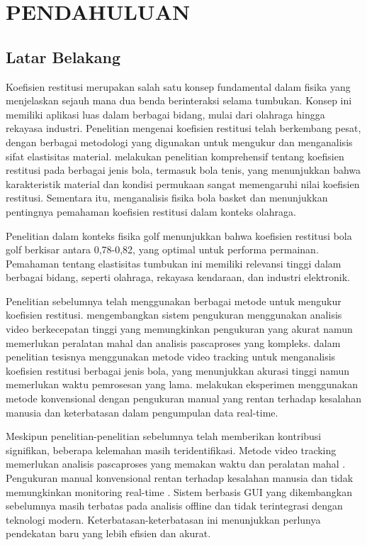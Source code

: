 \chapter{PENDAHULUAN}

\section{Latar Belakang}\label{sec:latar}
 Koefisien restitusi merupakan salah satu konsep fundamental dalam fisika yang menjelaskan sejauh mana dua benda berinteraksi selama tumbukan. Konsep ini memiliki aplikasi luas dalam berbagai bidang, mulai dari olahraga hingga rekayasa industri. Penelitian mengenai koefisien restitusi telah berkembang pesat, dengan berbagai metodologi yang digunakan untuk mengukur dan menganalisis sifat elastisitas material. \citep{cross2002coefficient} melakukan penelitian komprehensif tentang koefisien restitusi pada berbagai jenis bola, termasuk bola tenis, yang menunjukkan bahwa karakteristik material dan kondisi permukaan sangat memengaruhi nilai koefisien restitusi. Sementara itu, \citep{brancazio1981physics} menganalisis fisika bola basket dan menunjukkan pentingnya pemahaman koefisien restitusi dalam konteks olahraga.

Penelitian \citep{penner2002physics} dalam konteks fisika golf menunjukkan bahwa koefisien restitusi bola golf berkisar antara 0,78-0,82, yang optimal untuk performa permainan. Pemahaman tentang elastisitas tumbukan ini memiliki relevansi tinggi dalam berbagai bidang, seperti olahraga, rekayasa kendaraan, dan industri elektronik.

 Penelitian sebelumnya telah menggunakan berbagai metode untuk mengukur koefisien restitusi. \citep{meyer2020coefficient} mengembangkan sistem pengukuran menggunakan analisis video berkecepatan tinggi yang memungkinkan pengukuran yang akurat namun memerlukan peralatan mahal dan analisis pascaproses yang kompleks. \citep{hartono2019analisis} dalam penelitian tesisnya menggunakan metode video tracking untuk menganalisis koefisien restitusi berbagai jenis bola, yang menunjukkan akurasi tinggi namun memerlukan waktu pemrosesan yang lama. \citep{smith2018experimental} melakukan eksperimen menggunakan metode konvensional dengan pengukuran manual yang rentan terhadap kesalahan manusia dan keterbatasan dalam pengumpulan data real-time.

 Meskipun penelitian-penelitian sebelumnya telah memberikan kontribusi signifikan, beberapa kelemahan masih teridentifikasi. Metode video tracking memerlukan analisis pascaproses yang memakan waktu dan peralatan mahal \citep{meyer2020coefficient}. Pengukuran manual konvensional rentan terhadap kesalahan manusia dan tidak memungkinkan monitoring real-time \citep{smith2018experimental}. Sistem berbasis GUI yang dikembangkan sebelumnya masih terbatas pada analisis offline dan tidak terintegrasi dengan teknologi modern. Keterbatasan-keterbatasan ini menunjukkan perlunya pendekatan baru yang lebih efisien dan akurat.

